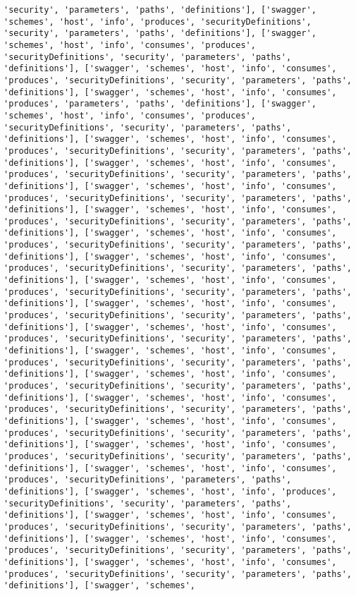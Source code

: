 \documentclass[11pt]{article}
\begin{document}
\begin{Verbatim}[commandchars=\\\{\}]
'security', 'parameters', 'paths', 'definitions'], ['swagger', 'schemes', 'host', 'info', 'produces', 'securityDefinitions', 'security', 'parameters', 'paths', 'definitions'], ['swagger', 'schemes', 'host', 'info', 'consumes', 'produces', 'securityDefinitions', 'security', 'parameters', 'paths', 'definitions'], ['swagger', 'schemes', 'host', 'info', 'consumes', 'produces', 'securityDefinitions', 'security', 'parameters', 'paths', 'definitions'], ['swagger', 'schemes', 'host', 'info', 'consumes', 'produces', 'parameters', 'paths', 'definitions'], ['swagger', 'schemes', 'host', 'info', 'consumes', 'produces', 'securityDefinitions', 'security', 'parameters', 'paths', 'definitions'], ['swagger', 'schemes', 'host', 'info', 'consumes', 'produces', 'securityDefinitions', 'security', 'parameters', 'paths', 'definitions'], ['swagger', 'schemes', 'host', 'info', 'consumes', 'produces', 'securityDefinitions', 'security', 'parameters', 'paths', 'definitions'], ['swagger', 'schemes', 'host', 'info', 'consumes', 'produces', 'securityDefinitions', 'security', 'parameters', 'paths', 'definitions'], ['swagger', 'schemes', 'host', 'info', 'consumes', 'produces', 'securityDefinitions', 'security', 'parameters', 'paths', 'definitions'], ['swagger', 'schemes', 'host', 'info', 'consumes', 'produces', 'securityDefinitions', 'security', 'parameters', 'paths', 'definitions'], ['swagger', 'schemes', 'host', 'info', 'consumes', 'produces', 'securityDefinitions', 'security', 'parameters', 'paths', 'definitions'], ['swagger', 'schemes', 'host', 'info', 'consumes', 'produces', 'securityDefinitions', 'security', 'parameters', 'paths', 'definitions'], ['swagger', 'schemes', 'host', 'info', 'consumes', 'produces', 'securityDefinitions', 'security', 'parameters', 'paths', 'definitions'], ['swagger', 'schemes', 'host', 'info', 'consumes', 'produces', 'securityDefinitions', 'security', 'parameters', 'paths', 'definitions'], ['swagger', 'schemes', 'host', 'info', 'consumes', 'produces', 'securityDefinitions', 'security', 'parameters', 'paths', 'definitions'], ['swagger', 'schemes', 'host', 'info', 'consumes', 'produces', 'securityDefinitions', 'security', 'parameters', 'paths', 'definitions'], ['swagger', 'schemes', 'host', 'info', 'consumes', 'produces', 'securityDefinitions', 'security', 'parameters', 'paths', 'definitions'], ['swagger', 'schemes', 'host', 'info', 'consumes', 'produces', 'securityDefinitions', 'security', 'parameters', 'paths', 'definitions'], ['swagger', 'schemes', 'host', 'info', 'consumes', 'produces', 'securityDefinitions', 'security', 'parameters', 'paths', 'definitions'], ['swagger', 'schemes', 'host', 'info', 'consumes', 'produces', 'securityDefinitions', 'parameters', 'paths', 'definitions'], ['swagger', 'schemes', 'host', 'info', 'produces', 'securityDefinitions', 'security', 'parameters', 'paths', 'definitions'], ['swagger', 'schemes', 'host', 'info', 'consumes', 'produces', 'securityDefinitions', 'security', 'parameters', 'paths', 'definitions'], ['swagger', 'schemes', 'host', 'info', 'consumes', 'produces', 'securityDefinitions', 'security', 'parameters', 'paths', 'definitions'], ['swagger', 'schemes', 'host', 'info', 'consumes', 'produces', 'securityDefinitions', 'security', 'parameters', 'paths', 'definitions'], ['swagger', 'schemes', 
\end{Verbatim}
\end{document}
